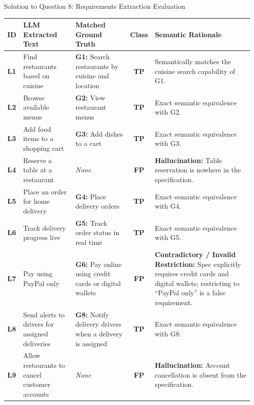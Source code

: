\documentclass[11pt,a4paper]{article}
\begin{document}
\begin{solutionbox}{Solution to Question 8: Requirements Extraction Evaluation}
\begin{center}
\small
\begin{tabularx}{\linewidth}{l X X c p{4.2cm}}
\toprule
\textbf{ID} & \textbf{LLM Extracted Text} & \textbf{Matched Ground Truth} & \textbf{Class} & \textbf{Semantic Rationale} \\
\midrule
\textbf{L1} & Find restaurants based on cuisine & \textbf{G1:} Search restaurants by cuisine and location & \textbf{TP} & Semantically matches the cuisine search capability of G1. \\
\textbf{L2} & Browse available menus & \textbf{G2:} View restaurant menus & \textbf{TP} & Exact semantic equivalence with G2. \\
\textbf{L3} & Add food items to a shopping cart & \textbf{G3:} Add dishes to a cart & \textbf{TP} & Exact semantic equivalence with G3. \\
\textbf{L4} & Reserve a table at a restaurant & \textit{None} & \textbf{FP} & \textbf{Hallucination:} Table reservation is nowhere in the specification. \\
\textbf{L5} & Place an order for home delivery & \textbf{G4:} Place delivery orders & \textbf{TP} & Exact semantic equivalence with G4. \\
\textbf{L6} & Track delivery progress live & \textbf{G5:} Track order status in real time & \textbf{TP} & Exact semantic equivalence with G5. \\
\textbf{L7} & Pay using PayPal only & \textbf{G6:} Pay online using credit cards or digital wallets & \textbf{FP} & \textbf{Contradictory / Invalid Restriction:} Spec explicitly requires credit cards and digital wallets; restricting to ``PayPal only'' is a false requirement. \\
\textbf{L8} & Send alerts to drivers for assigned deliveries & \textbf{G8:} Notify delivery drivers when a delivery is assigned & \textbf{TP} & Exact semantic equivalence with G8. \\
\textbf{L9} & Allow restaurants to cancel customer accounts & \textit{None} & \textbf{FP} & \textbf{Hallucination:} Account cancellation is absent from the specification. \\
\bottomrule
\end{tabularx}
\end{center}


\end{solutionbox}
\end{document}
